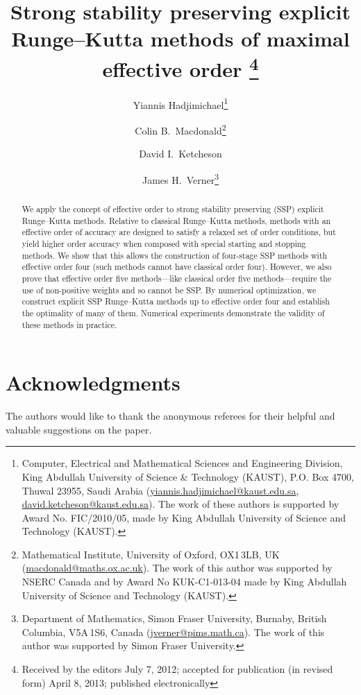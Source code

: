 \documentclass[10pt,a4paper,oneside]{article}
\title{Strong stability preserving explicit Runge--Kutta methods of maximal effective order
		\thanks{Received by the editors July 7, 2012; 
		accepted for publication (in revised form) April 8, 2013; 
		published electronically }
}%
\author{
        Yiannis Hadjimichael\thanks{Computer, Electrical and Mathematical Sciences and 
        Engineering Division, King Abdullah University of Science \& Technology (KAUST), 
        P.O. Box 4700, Thuwal 23955, Saudi Arabia
        (\url{yiannis.hadjimichael@kaust.edu.sa}, 
        \url{david.ketcheson@kaust.edu.sa}).
        The work of these authors is supported by Award No. FIC/2010/05, made by King 
        Abdullah University of Science and Technology (KAUST).}
        \and 
        Colin B.~Macdonald\thanks{Mathematical Institute, University of Oxford, OX1\,3LB, UK 
        (\url{macdonald@maths.ox.ac.uk}).
        The work of this author was supported by NSERC 
        Canada and by Award No KUK-C1-013-04 made by King Abdullah University of Science 
        and Technology (KAUST).}
        \and 
        David I.~Ketcheson\footnotemark[1]
        \and 
        James H.~Verner\thanks{Department of Mathematics, Simon Fraser University,
        Burnaby, British Columbia, V5A\,1S6, Canada
        (\url{jverner@pims.math.ca}).
        The work of this author was supported by Simon Fraser University.}
}%
\date{}
\begin{document}
        \maketitle
        
        \begin{abstract}
                We apply the concept of effective order to strong stability preserving 
                (SSP) explicit Runge--Kutta methods.
                Relative to classical Runge--Kutta methods, methods with an effective order of accuracy
                are designed to satisfy a relaxed set of order conditions, but yield higher 
                order accuracy  when composed with special starting and stopping methods. 
         We show that this allows the construction of four-stage SSP methods with 
         effective order four (such methods cannot have classical order four). 
         However, we also prove that effective order five methods---like classical
         order five methods---require the use of non-positive weights and so cannot
         be SSP.
         By numerical optimization, we construct explicit SSP Runge--Kutta methods 
         up to effective order four and establish the optimality of many of them.
                Numerical experiments demonstrate the validity of these methods in
                practice.
        \end{abstract}
		
%
%
		
        
        
        
        
        
        
        

        \section*{Acknowledgments}{%
                The authors would like to thank the anonymous referees for their helpful 
                and valuable suggestions on the paper.
                \vspace*{20pt}
         }%
		
        
		
\end{document}
